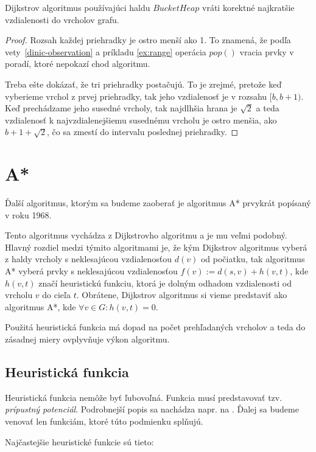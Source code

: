\begin{theorem}
Dijkstrov algoritmus používajúci haldu $BucketHeap$ vráti korektné najkratšie vzdialenosti do vrcholov grafu.
\end{theorem}
\begin{proof}
Rozsah každej priehradky je ostro menší ako 1. To znamená, že podľa vety~\ref{dinic-observation} a príkladu \ref{ex:range} operácia $pop()$ vracia prvky v poradí, ktoré
nepokazí chod algoritmu. 

Treba ešte dokázať, že tri priehradky postačujú. To je zrejmé,
pretože keď vyberieme vrchol z prvej priehradky, tak jeho vzdialenosť je v rozsahu $[b, b+1)$. Keď prechádzame jeho susedné vrcholy, tak najdlhšia hrana je $ \sqrt{2} $ a teda vzdialenosť k najvzdialenejšiemu susednému vrcholu je ostro menšia, ako $b+1+\sqrt{2}$, čo sa zmestí do intervalu poslednej priehradky.
\end{proof}


\section{A*}
Ďalší algoritmus, ktorým sa budeme zaoberať je algoritmus
A* \cite{astar72} prvykrát popísaný v roku 1968.

Tento algoritmus vychádza z Dijkstrovho algoritmu a je mu veľmi podobný. Hlavný rozdiel medzi týmito algoritmami je, že
kým Dijkstrov algoritmus vyberá z haldy vrcholy s neklesajúcou vzdialenosťou $ d(v) $ od počiatku, tak algoritmus A* vyberá prvky s neklesajúcou vzdialenosťou $ f(v) := d(s,v) + h(v,t) $, kde $ h(v, t) $ značí heuristickú funkciu, ktorá je dolným odhadom vzdialenosti od vrcholu $ v $ do cieľa $ t $. Obrátene, Dijkstrov algoritmus si vieme predstaviť ako algoritmus A*, kde $ \forall v \in G: h(v, t) = 0 $.

Použitá heuristická funkcia má dopad na počet prehľadaných vrcholov a teda do zásadnej miery ovplyvňuje výkon algoritmu.

\subsection{Heuristická funkcia}
 Heuristická funkcia nemôže byť ľubovoľná. Funkcia musí predstavovať tzv. {\sl prípustný potenciál}. Podrobnejší popis sa nachádza napr. na \cite{mares07} \cite{golberg01} \cite{goldbergharrelson05}. Ďalej sa budeme venovať len funkciám, ktoré túto podmienku splňujú.


Najčastejšie heuristické funkcie sú tieto:

